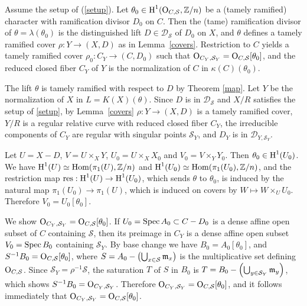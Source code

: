 \documentclass{amsart}
\theoremstyle{plain}
\theoremstyle{definition}
\theoremstyle{remark}
\numberwithin{equation}{section}%
\renewcommand{\H}{{\text{\rm H}}}
\renewcommand{\O}{{\text{\rm O}}}
\renewcommand{\S}{{\mathcal S}}
\newcommand{\Z}{{\mathbb Z}}
\newcommand{\isom}{{\;\simeq\;}}
\newcommand{\res}{{\text{\rm res}}}
\newcommand{\Hom}{{\text{\rm Hom}}}
\newcommand{\Pf}{{\noindent{\it Proof.}\;\;}}
\newcommand{\Spec}{{\text{\rm Spec}\,}}
\begin{document}
\Lemma\label{cycliccovers}
Assume the setup of (\ref{setup}).
Let $\theta_0\in\H^1(\O_{C,\S},\Z/n)$ be a (tamely ramified) character
with ramification divisor $D_0$ on $C$.
Then the (tame) ramification divisor of $\theta=\lambda(\theta_0)$ is
the distinguished lift $D\in\mathscr D_\S$ of $D_0$ on $X$, and 
$\theta$ defines a tamely ramified cover $\rho:Y\to(X,D)$
as in Lemma~\ref{covers}.
Restriction to $C$ yields a tamely ramified cover
$\rho_0:C_Y\to(C,D_0)$ such that $\O_{C_Y,\S_Y}=\O_{C,\S}[\theta_0]$, 
and the reduced closed fiber
$C_Y$ of $Y$ is the normalization of $C$ in $\kappa(C)(\theta_0)$.
\rm

\Pf
The lift $\theta$ is tamely ramified with respect to $D$ by Theorem \ref{map}.
Let $Y$ be the normalization of $X$ in $L=K(X)(\theta)$.
Since $D$ is in $\mathscr D_\S$ and $X/R$ satisfies the setup of \eqref{setup}, by 
Lemma~\ref{covers} $\rho:Y\to(X,D)$ is a tamely ramified cover,
$Y/R$ is a regular relative curve with reduced closed fiber $C_Y$,
the irreducible components of $C_Y$ are regular with singular points $\S_Y$,
and $D_Y$ is in $\mathscr D_{Y,\S_Y}$.

Let $U=X-D$, $V=U\times_X Y$, $U_0=U\times_X X_0$ and $V_0=V\times_Y Y_0$.
Then $\theta_0\in\H^1(U_0)$.
We have $\H^1(U)\isom\Hom(\pi_1(U),\Z/n)$ and $\H^1(U_0)\isom\Hom(\pi_1(U_0),\Z/n)$,
and the restriction map $\res:\H^1(U)\to\H^1(U_0)$, which sends $\theta$ to $\theta_0$, 
is induced by the natural map $\pi_1(U_0)\to\pi_1(U)$,
which is induced on covers by $W\mapsto W\times_U U_0$.
Therefore $V_0=U_0[\theta_0]$.

We show $\O_{C_Y,\mathcal S_Y}=\O_{C,\S}[\theta_0]$.
If $U_0=\Spec A_0\subset C-D_0$ is a dense affine open subset of $C$ containing $\S$,
then its preimage in $C_Y$ is a dense affine open subset $V_0=\Spec B_0$ containing $\mathcal S_Y$.
By base change we have $B_0=A_0[\theta_0]$, and $S^{-1}B_0=\O_{C,\S}[\theta_0]$,
where $S=A_0-\left(\bigcup_{x\in\S}\frak m_x\right)$ is the multiplicative set defining $\O_{C,\S}$.
Since $\mathcal S_Y=\rho^{-1}\S$,
the saturation $T$ of $S$ in $B_0$ is $T=B_0-\left(\bigcup_{y\in\mathcal S_Y}\frak m_y\right)$,
which shows $S^{-1}B_0=\O_{C_Y,\mathcal S_Y}$.
Therefore $\O_{C_Y,\mathcal S_Y}=\O_{C,\S}[\theta_0]$, and it follows immediately
that $\O_{C_Y,\S_Y}=\O_{C,\S}[\theta_0]$.
\end{document}
